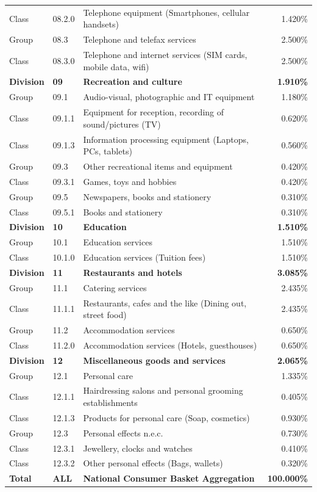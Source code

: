 \documentclass[11pt,a4paper]{article}
\begin{document}
\begin{longtable}{llp{7.5cm}r}
Class & 08.2.0 & Telephone equipment (Smartphones, cellular handsets) & 1.420\% \\
Group & 08.3 & Telephone and telefax services & 2.500\% \\
Class & 08.3.0 & Telephone and internet services (SIM cards, mobile data, wifi) & 2.500\% \\
\midrule
\textbf{Division} & \textbf{09} & \textbf{Recreation and culture} & \textbf{1.910\%} \\
Group & 09.1 & Audio-visual, photographic and IT equipment & 1.180\% \\
Class & 09.1.1 & Equipment for reception, recording of sound/pictures (TV) & 0.620\% \\
Class & 09.1.3 & Information processing equipment (Laptops, PCs, tablets) & 0.560\% \\
Group & 09.3 & Other recreational items and equipment & 0.420\% \\
Class & 09.3.1 & Games, toys and hobbies & 0.420\% \\
Group & 09.5 & Newspapers, books and stationery & 0.310\% \\
Class & 09.5.1 & Books and stationery & 0.310\% \\
\midrule
\textbf{Division} & \textbf{10} & \textbf{Education} & \textbf{1.510\%} \\
Group & 10.1 & Education services & 1.510\% \\
Class & 10.1.0 & Education services (Tuition fees) & 1.510\% \\
\midrule
\textbf{Division} & \textbf{11} & \textbf{Restaurants and hotels} & \textbf{3.085\%} \\
Group & 11.1 & Catering services & 2.435\% \\
Class & 11.1.1 & Restaurants, cafes and the like (Dining out, street food) & 2.435\% \\
Group & 11.2 & Accommodation services & 0.650\% \\
Class & 11.2.0 & Accommodation services (Hotels, guesthouses) & 0.650\% \\
\midrule
\textbf{Division} & \textbf{12} & \textbf{Miscellaneous goods and services} & \textbf{2.065\%} \\
Group & 12.1 & Personal care & 1.335\% \\
Class & 12.1.1 & Hairdressing salons and personal grooming establishments & 0.405\% \\
Class & 12.1.3 & Products for personal care (Soap, cosmetics) & 0.930\% \\
Group & 12.3 & Personal effects n.e.c. & 0.730\% \\
Class & 12.3.1 & Jewellery, clocks and watches & 0.410\% \\
Class & 12.3.2 & Other personal effects (Bags, wallets) & 0.320\% \\
\midrule
\textbf{Total} & \textbf{ALL} & \textbf{National Consumer Basket Aggregation} & \textbf{100.000\%} \\
\bottomrule
\end{longtable}
\end{document}
